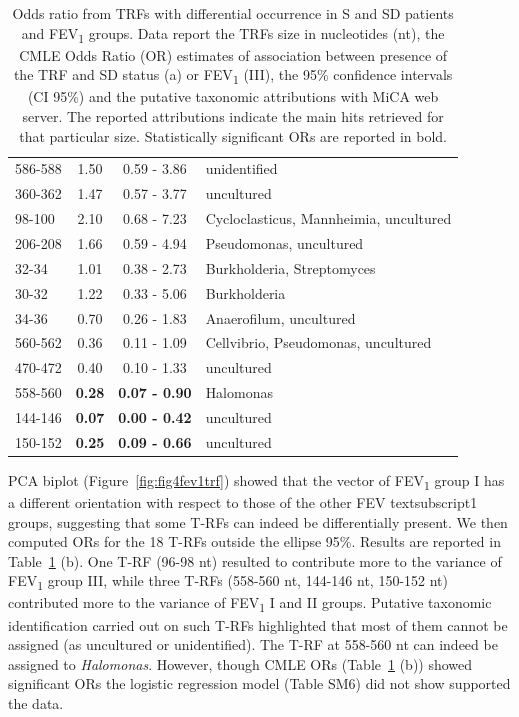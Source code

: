 \begin{table}
\begin{tabular}{l c c l}
586-588 & 1.50 & 0.59 - 3.86 & unidentified \\
360-362 & 1.47 & 0.57 - 3.77 & uncultured \\
98-100 & 2.10 & 0.68 - 7.23 & Cycloclasticus, Mannheimia, uncultured \\
206-208 & 1.66 & 0.59 - 4.94 & Pseudomonas, uncultured \\
32-34 & 1.01 & 0.38 - 2.73 & Burkholderia, Streptomyces \\
30-32 & 1.22 & 0.33 - 5.06 & Burkholderia \\
34-36 & 0.70 & 0.26 - 1.83 & Anaerofilum, uncultured \\
560-562 & 0.36 & 0.11 - 1.09 & Cellvibrio, Pseudomonas, uncultured \\
470-472 & 0.40 & 0.10 - 1.33 & uncultured \\
558-560 & \textbf{0.28} & \textbf{0.07 - 0.90} & Halomonas \\
144-146 & \textbf{0.07} & \textbf{0.00 - 0.42} & uncultured \\
150-152 & \textbf{0.25} & \textbf{0.09 - 0.66} & uncultured \\
\hline
\end{tabular}
\caption{\label{tab:ordettrflp} Odds ratio from TRFs with differential occurrence in S and SD patients and FEV\textsubscript{1} groups. Data report the TRFs size in nucleotides (nt), the CMLE Odds Ratio (OR) estimates of association between presence of the TRF and SD status (a) or FEV\textsubscript{1} (III), the 95\% confidence intervals (CI 95\%) and the putative taxonomic attributions with MiCA web server. The reported attributions indicate the main hits retrieved for that particular size. Statistically significant ORs are reported in bold.} 
\end{table}
PCA biplot (Figure~\ref{fig:fig4fev1trf}) showed that the vector of FEV\textsubscript{1} group I has a different orientation with respect to those of the other FEV textsubscript{1} groups, suggesting that some T-RFs can indeed be differentially present. We then computed ORs for the 18 T-RFs outside the ellipse 95\%. Results are reported in Table~\ref{tab:ordettrflp} (b). One T-RF (96-98 nt) resulted to contribute more to the variance of FEV\textsubscript{1} group III, while three T-RFs (558-560 nt, 144-146 nt, 150-152 nt) contributed more to the variance of FEV\textsubscript{1} I and II groups. Putative taxonomic identification carried out on such T-RFs highlighted that most of them cannot be assigned (as uncultured or unidentified). The T-RF at 558-560 nt can indeed be assigned to \textit{Halomonas}. However, though CMLE ORs (Table~\ref{tab:ordettrflp} (b)) showed significant ORs the logistic regression model (Table SM6) did not show supported the data.\\

